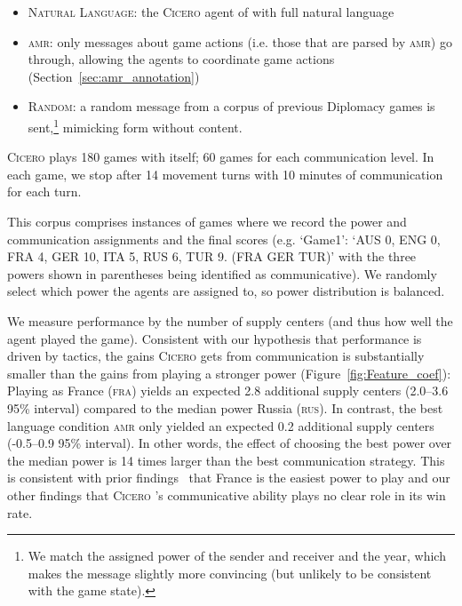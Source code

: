 \documentclass[oneside]{memoir}
\newcommand{\cicero}{\abr{Cicero} }
\newcommand{\abr}[1]{\textsc{#1}}
\begin{document}
\begin{itemize}    
    \item \abr{Natural Language}: the \cicero{} agent of \citet{meta2022human} with full natural language
    \item \abr{amr}: only messages about game actions (i.e. those that are parsed by \abr{amr}) go through, allowing the agents to coordinate game actions (Section~\ref{sec:amr_annotation})
    \item \abr{Random}: a random message from a corpus of previous Diplomacy games is sent,\footnote{We match the assigned power of the sender and receiver and the year, which makes the message slightly more convincing (but unlikely to be consistent with the game state).} mimicking form without content. %
\end{itemize}
%

\cicero{} plays 180 games with itself; 60 games for each communication
level.
%
In each game, we stop after 14 movement turns with 10 minutes
of communication for each turn.
%
%

This corpus comprises instances of games where we record the power and communication assignments and the final scores (e.g. `Game1': `AUS 0, ENG 0, FRA 4, GER 10, ITA 5, RUS 6, TUR 9. (FRA GER TUR)' with the three powers shown in parentheses being identified as communicative). We randomly select which power the agents are assigned to, so  power distribution is balanced.

We measure performance by the number of supply centers (and thus how well the agent played the game).
%
Consistent with our hypothesis that performance is driven by tactics, the gains \cicero{} gets from communication is substantially smaller than the gains from playing a stronger power (Figure~\ref{fig:Feature_coef}):
%
Playing as France (\abr{fra}) yields an expected 2.8 additional supply centers (2.0--3.6 95\% interval)  compared to the median power Russia (\abr{rus}). In contrast, the best language condition \abr{amr} only yielded an expected 0.2 additional supply centers (-0.5--0.9 95\% interval). In other words, the effect of choosing the best power over the median power is 14 times larger than the best communication strategy.
%
This is consistent with prior findings~\citep{sharp1978game} that France is the easiest power to play and our other findings that \cicero{}'s  communicative ability plays no clear role in its win rate.
\end{document}
